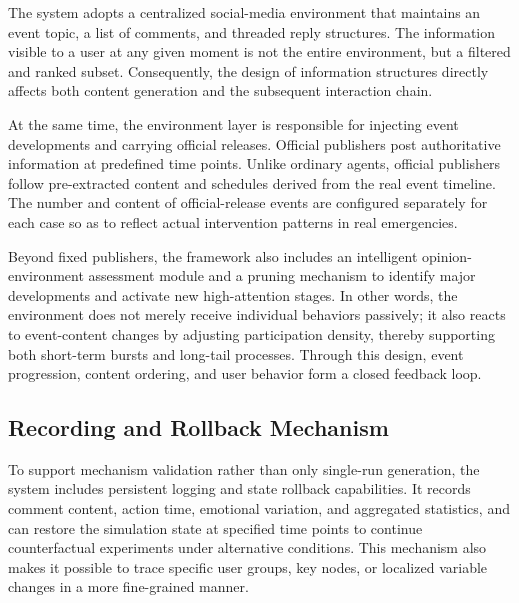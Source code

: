 The system adopts a centralized social-media environment that maintains an event topic, a list of comments, and threaded reply structures. The information visible to a user at any given moment is not the entire environment, but a filtered and ranked subset. Consequently, the design of information structures directly affects both content generation and the subsequent interaction chain.

At the same time, the environment layer is responsible for injecting event developments and carrying official releases. Official publishers post authoritative information at predefined time points. Unlike ordinary agents, official publishers follow pre-extracted content and schedules derived from the real event timeline. The number and content of official-release events are configured separately for each case so as to reflect actual intervention patterns in real emergencies.

Beyond fixed publishers, the framework also includes an intelligent opinion-environment assessment module and a pruning mechanism to identify major developments and activate new high-attention stages. In other words, the environment does not merely receive individual behaviors passively; it also reacts to event-content changes by adjusting participation density, thereby supporting both short-term bursts and long-tail processes. Through this design, event progression, content ordering, and user behavior form a closed feedback loop.

\subsection{Recording and Rollback Mechanism}

To support mechanism validation rather than only single-run generation, the system includes persistent logging and state rollback capabilities. It records comment content, action time, emotional variation, and aggregated statistics, and can restore the simulation state at specified time points to continue counterfactual experiments under alternative conditions. This mechanism also makes it possible to trace specific user groups, key nodes, or localized variable changes in a more fine-grained manner.

